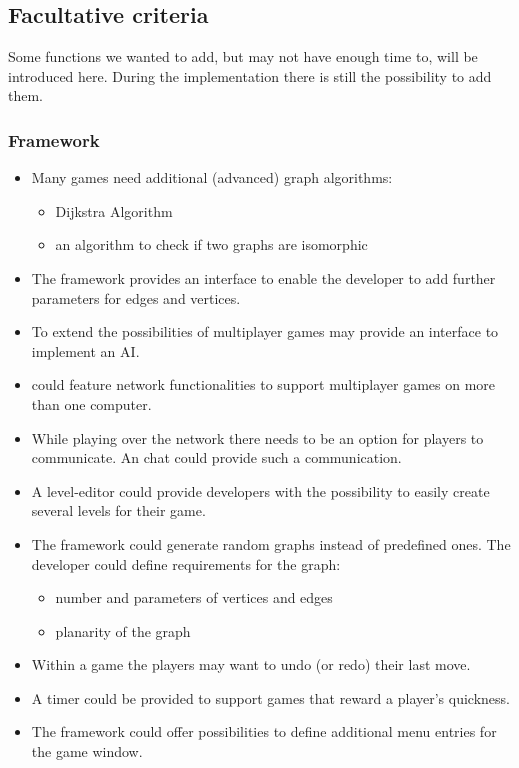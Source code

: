 \subsection{Facultative criteria}\label{REF:FACULTATIVE-CRITERIA}
Some functions we wanted to add, but may not have enough time to, will be introduced here. During the implementation there is still the possibility to add them.

\subsubsection{Framework}
\begin{itemize}

	\item Many \glspl{game} need additional (advanced) \gls{graph} \glspl{algorithm}:
	\begin{itemize}
		\item Dijkstra Algorithm
		\item an algorithm to check if two graphs are isomorphic
	\end{itemize}

	\item The framework provides an interface to enable the developer to add further parameters for edges and vertices.
	\item To extend the possibilities of multiplayer games \graphioli may provide an interface to implement an \gls{AI}.

	\item \graphioli could feature network functionalities to support multiplayer games on more than one computer.

	\item While playing over the network there needs to be an option for players to communicate. An \gls{chat} could provide such a communication.

	\item A \gls{level-editor} could provide \glspl{developer} with the possibility to easily create several levels for their game.

	\item The framework could generate random graphs instead of predefined ones. The developer could define requirements for the graph:
	\begin{itemize}
		\item number and parameters of vertices and edges
		\item planarity of the graph
	\end{itemize}

	\item Within a game the players may want to \gls{undo} (or \gls{redo}) their last move.

	\item A timer could be provided to support games that reward a player's quickness.

	\item The framework could offer possibilities to define additional menu entries for the game window.

\end{itemize}

